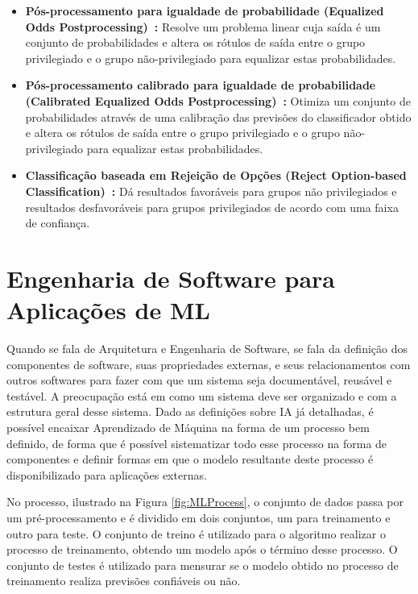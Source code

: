 \documentclass[portugues]{ic-tese}
\begin{document}
\begin{itemize}
\item \textbf{Pós-processamento para igualdade de probabilidade (Equalized Odds Postprocessing)~\citep{Hardt_2016}:} Resolve um problema linear cuja saída é um conjunto de probabilidades e altera os rótulos de saída entre o grupo privilegiado e o grupo não-privilegiado para equalizar estas probabilidades.

\item \textbf{Pós-processamento calibrado para igualdade de probabilidade (Calibrated Equalized Odds Postprocessing)~\citep{Pleiss_2017}:} Otimiza um conjunto de probabilidades através de uma calibração das previsões do classificador obtido e altera os rótulos de saída entre o grupo privilegiado e o grupo não-privilegiado para equalizar estas probabilidades.

\item \textbf{Classificação baseada em Rejeição de Opções (Reject Option-based Classification)~\citep{Kamiran_2012}:} Dá resultados favoráveis para grupos não privilegiados e resultados desfavoráveis para grupos privilegiados de acordo com uma faixa de confiança.

\end{itemize}

\section{Engenharia de Software para Aplicações de ML}
\label{sec:EngSoftware}

Quando se fala de Arquitetura e Engenharia de Software, se fala da definição dos componentes de software, suas propriedades externas, e seus relacionamentos com outros softwares para fazer com que um sistema seja documentável, reusável e testável. A preocupação está em como um sistema deve ser organizado e com a estrutura geral desse sistema. Dado as definições sobre IA já detalhadas, é possível encaixar Aprendizado de Máquina na forma de um processo bem definido, de forma que é possível sistematizar todo esse processo na forma de componentes e definir formas em que o modelo resultante deste processo é disponibilizado para aplicações externas.

No processo, ilustrado na Figura \ref{fig:MLProcess}, o conjunto de dados passa por um pré-processamento e é dividido em dois conjuntos, um para treinamento e outro para teste. O conjunto de treino é utilizado para o algoritmo realizar o processo de treinamento, obtendo um modelo após o término desse processo. O conjunto de testes é utilizado para mensurar se o modelo obtido no processo de treinamento realiza previsões confiáveis ou não.
\end{document}
